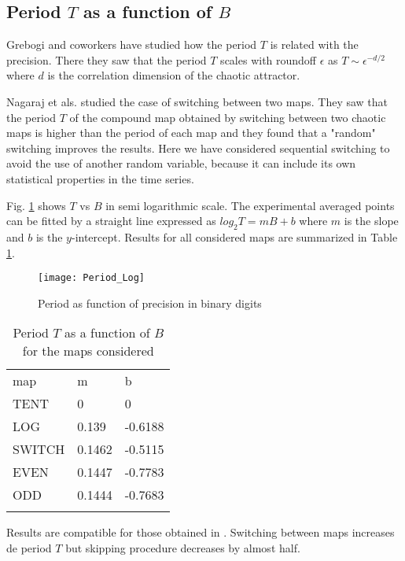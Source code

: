 \subsection{Period $T$ as a function of $B$}

Grebogi and coworkers \cite{Grebogi1988} have studied how the period $T$ is related with the precision.
There they saw that the period $T$ scales with roundoff $\epsilon$ as $T\sim\epsilon^{-d/2}$ where $d$ is the correlation dimension of the chaotic attractor.

Nagaraj et als. \cite{Nagaraj2008} studied the case of switching between two maps.
They saw that the period $T$ of the compound map obtained by switching between two chaotic maps is higher than the period of each map and they found that a "random" switching improves the results.
Here we have considered sequential switching to avoid the use of another random variable, because it can include its own statistical properties in the time series.

Fig. \ref{fig:period} shows  $T$ vs $B$ in semi logarithmic scale.
The experimental averaged points can be fitted by a straight line expressed as $log_{2}T=m B + b$ where $m$ is the slope and $b$ is the $y$-intercept.
Results for all considered maps are summarized in Table \ref{tabla:periodos}.

\begin{figure}
	\texttt{[image: Period\_Log]}
	\caption{Period as function of precision in binary digits} \label{fig:period}
\end{figure}

\begin{table}
	\caption{Period $T$ as a function of $B$ for the maps considered}
	\label{tabla:periodos}
	\begin{tabular}{lll}
		\hline\noalign{\smallskip}
		map & m & b  \\
		\noalign{\smallskip}\hline\noalign{\smallskip}
		TENT&0 & 0 \\
		LOG &0.139 & -0.6188 \\
		SWITCH &0.1462 & -0.5115 \\
		EVEN &0.1447 & -0.7783 \\
		ODD &0.1444 & -0.7683 \\
		\noalign{\smallskip}\hline
	\end{tabular}
\end{table}

Results are compatible for those obtained in \cite{Nagaraj2008}.
Switching between maps increases de period $T$ but skipping procedure decreases by almost half.